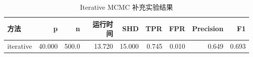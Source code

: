 \begin{table}[H]
\centering
\small
\setlength{\tabcolsep}{2pt}
\caption{Iterative MCMC 补充实验结果}
\label{tab:highdim}
\begin{tabular}{lrrrrrrrr}
\toprule
方法 & p & n & 运行时间 & SHD & TPR & FPR & Precision & F1
\\
\midrule
iterative & 40.000 & 500.0 & 13.720 & 15.000 & 0.745 & 0.010 & 0.649 & 0.693 \\
\bottomrule
\end{tabular}
\end{table}
